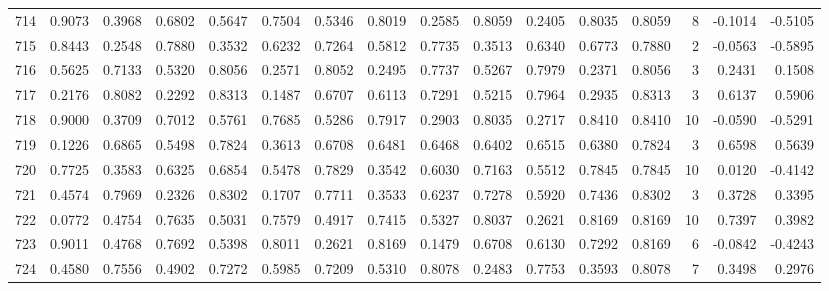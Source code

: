 \begin{tabular}{lrrrrrrrrrrrrrrr}
714 &      0.9073 &  0.3968 &  0.6802 &  0.5647 &  0.7504 &  0.5346 &  0.8019 &  0.2585 &  0.8059 &  0.2405 &   0.8035 &     0.8059 &      8 &                   -0.1014 &                    -0.5105 \\
715 &      0.8443 &  0.2548 &  0.7880 &  0.3532 &  0.6232 &  0.7264 &  0.5812 &  0.7735 &  0.3513 &  0.6340 &   0.6773 &     0.7880 &      2 &                   -0.0563 &                    -0.5895 \\
716 &      0.5625 &  0.7133 &  0.5320 &  0.8056 &  0.2571 &  0.8052 &  0.2495 &  0.7737 &  0.5267 &  0.7979 &   0.2371 &     0.8056 &      3 &                    0.2431 &                     0.1508 \\
717 &      0.2176 &  0.8082 &  0.2292 &  0.8313 &  0.1487 &  0.6707 &  0.6113 &  0.7291 &  0.5215 &  0.7964 &   0.2935 &     0.8313 &      3 &                    0.6137 &                     0.5906 \\
718 &      0.9000 &  0.3709 &  0.7012 &  0.5761 &  0.7685 &  0.5286 &  0.7917 &  0.2903 &  0.8035 &  0.2717 &   0.8410 &     0.8410 &     10 &                   -0.0590 &                    -0.5291 \\
719 &      0.1226 &  0.6865 &  0.5498 &  0.7824 &  0.3613 &  0.6708 &  0.6481 &  0.6468 &  0.6402 &  0.6515 &   0.6380 &     0.7824 &      3 &                    0.6598 &                     0.5639 \\
720 &      0.7725 &  0.3583 &  0.6325 &  0.6854 &  0.5478 &  0.7829 &  0.3542 &  0.6030 &  0.7163 &  0.5512 &   0.7845 &     0.7845 &     10 &                    0.0120 &                    -0.4142 \\
721 &      0.4574 &  0.7969 &  0.2326 &  0.8302 &  0.1707 &  0.7711 &  0.3533 &  0.6237 &  0.7278 &  0.5920 &   0.7436 &     0.8302 &      3 &                    0.3728 &                     0.3395 \\
722 &      0.0772 &  0.4754 &  0.7635 &  0.5031 &  0.7579 &  0.4917 &  0.7415 &  0.5327 &  0.8037 &  0.2621 &   0.8169 &     0.8169 &     10 &                    0.7397 &                     0.3982 \\
723 &      0.9011 &  0.4768 &  0.7692 &  0.5398 &  0.8011 &  0.2621 &  0.8169 &  0.1479 &  0.6708 &  0.6130 &   0.7292 &     0.8169 &      6 &                   -0.0842 &                    -0.4243 \\
724 &      0.4580 &  0.7556 &  0.4902 &  0.7272 &  0.5985 &  0.7209 &  0.5310 &  0.8078 &  0.2483 &  0.7753 &   0.3593 &     0.8078 &      7 &                    0.3498 &                     0.2976 \\

\end{tabular}

